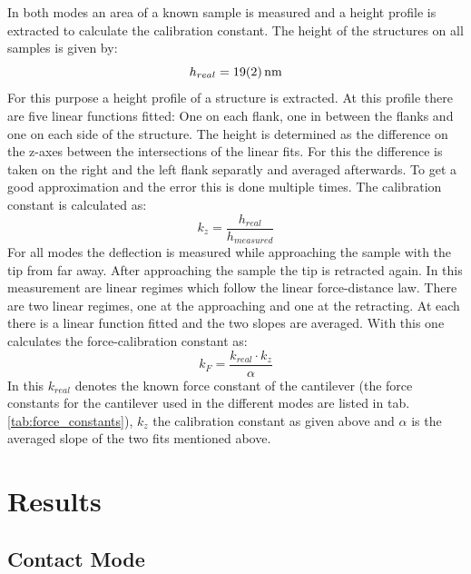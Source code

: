 \documentclass[%
 reprint,
amsmath,amssymb,
pra,
]{revtex4-1}
\begin{document}
In both modes an area of a known sample is measured and a height profile is extracted to calculate the calibration constant. The height of the structures on all samples is given by:
\begin{equation*}
h_{real} = \SI{19 \pm 2}{nm}
\end{equation*}
For this purpose a height profile of a structure is extracted. At this profile there are five linear functions fitted: One on each flank, one in between the flanks and one on each side of the structure. The height is determined as the difference on the z-axes between the intersections of the linear fits. For this the difference is taken on the right and the left flank separatly and averaged afterwards. To get a good approximation and the error this is done multiple times. The calibration constant is calculated as:
\begin{equation*}
k_z = \dfrac{h_{real}}{h_{measured}}
\end{equation*}
For all modes the deflection is measured while approaching the sample with the tip from far away. After approaching the sample the tip is retracted again. In this measurement are linear regimes which follow the linear force-distance law. There are two linear regimes, one at the approaching and one at the retracting. At each there is a linear function fitted and the two slopes are averaged. With this one calculates the force-calibration constant as:
\begin{equation*}
k_F = \dfrac{k_{real} \cdot k_z}{\alpha}
\end{equation*}
In this $k_{real}$ denotes the known force constant of the cantilever (the force constants for the cantilever used in the different modes are listed in tab. \ref{tab:force_constants}), $k_z$ the calibration constant as given above and $\alpha$ is the averaged slope of the two fits mentioned above. \\

\section{Results}
\subsection{Contact Mode}
\end{document}
